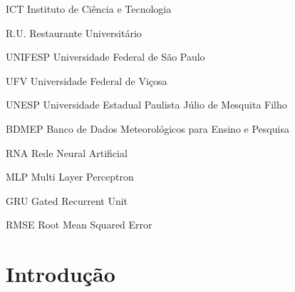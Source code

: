 \documentclass[	12pt, Times, openright, twoside, a4paper, english, brazil]{abntex2}
\begin{document}
    \listoffigures*
    \cleardoublepage

    \listoftables*
    \cleardoublepage

    \begin{siglas}
    \item[ICT] Instituto de Ciência e Tecnologia
    \item[R.U.] Restaurante Universitário
    \item[UNIFESP] Universidade Federal de São Paulo
    \item[UFV] Universidade Federal de Viçosa
    \item[UNESP] Universidade Estadual Paulista Júlio de Mesquita Filho
    \item[BDMEP] Banco de Dados Meteorológicos para Ensino e Pesquisa
    \item[RNA] Rede Neural Artificial
    \item[MLP] Multi Layer Perceptron
    \item[GRU] Gated Recurrent Unit
    \item[RMSE] Root Mean Squared Error

    \end{siglas}


    \tableofcontents*
    \cleardoublepage

  \textual

  \chapter{Introdução}
\end{document}

